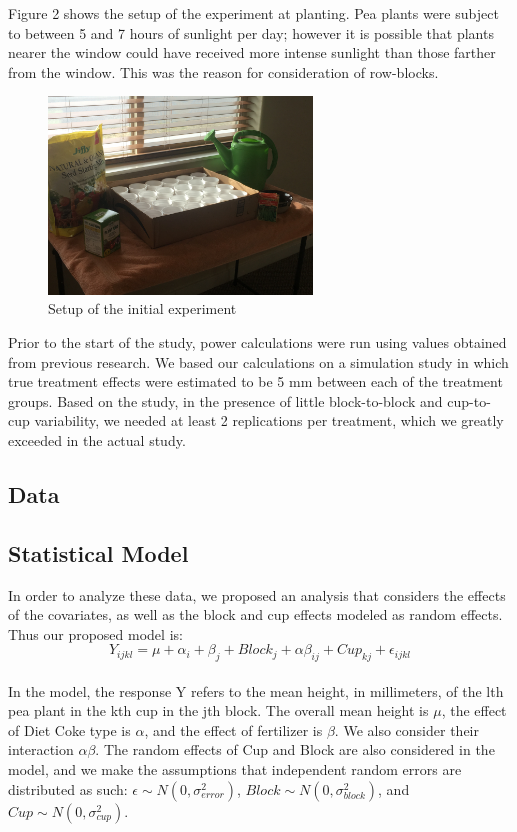 \documentclass[1p,12pt]{elsarticle}\usepackage[]{graphicx}\usepackage[]{color}
\begin{document}
Figure 2 shows the setup of the experiment at planting. Pea plants were subject to between 5 and 7 hours of sunlight per day; however it is possible that plants nearer the window could have received more intense sunlight than those farther from the window. This was the reason for consideration of row-blocks. 

 \begin{figure}[h!]
 	\caption{Setup of the initial experiment}
 	\centering
	\includegraphics[width = 7cm]{figure/setup.JPG}
\end{figure}

Prior to the start of the study, power calculations were run using values obtained from previous research.  We based our calculations on a simulation study in which true treatment effects were estimated to be 5 mm between each of the treatment groups. Based on the study, in the presence of little block-to-block and cup-to-cup variability, we needed at least 2 replications per treatment, which we greatly exceeded in the actual study. 


\subsection{Data}

\subsection{Statistical Model}
In order to analyze these data, we proposed an analysis that considers the effects of the covariates, as well as the block and cup effects modeled as random effects. Thus our proposed model is: 
\\
\begin{equation}
Y_{ijkl} = \mu + \alpha_i + \beta_j + Block_j + \alpha\beta_{ij}+ Cup_{kj} + \epsilon_{ijkl}
\end{equation}
\\
In the model, the response Y refers to the mean height, in millimeters, of the lth pea plant in the kth cup in the jth block. The overall mean height is $\mu$, the effect of Diet Coke type is $\alpha$, and the effect of fertilizer is $\beta$. We also consider their interaction $\alpha\beta$. The random effects of Cup and Block are also considered in the model, and we make the assumptions that independent random errors are distributed as such: $\epsilon \sim N(0,\sigma^2_{error})$, $Block \sim N(0,\sigma^2_{block})$, and $Cup \sim N(0,\sigma^2_{cup})$. 
\end{document}
